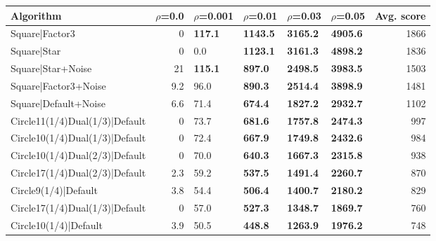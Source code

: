 \begin{tabular}{lrllllr}
\hline
 Algorithm                                                      &   $\rho$=0.0 & $\rho$=0.001   & $\rho$=0.01     & $\rho$=0.03     & $\rho$=0.05     &   Avg. score \\
\hline
 Square|Factor3                                                 &          0   & \textbf{117.1} & \textbf{1143.5} & \textbf{3165.2} & \textbf{4905.6} &         1866 \\
 Square|Star                                                    &          0   & 0.0            & \textbf{1123.1} & \textbf{3161.3} & \textbf{4898.2} &         1836 \\
 Square|Star+Noise                                              &         21   & \textbf{115.1} & \textbf{897.0}  & \textbf{2498.5} & \textbf{3983.5} &         1503 \\
 Square|Factor3+Noise                                           &          9.2 & 96.0           & \textbf{890.3}  & \textbf{2514.4} & \textbf{3898.9} &         1481 \\
 Square|Default+Noise                                           &          6.6 & 71.4           & \textbf{674.4}  & \textbf{1827.2} & \textbf{2932.7} &         1102 \\
 Circle11(1/4)Dual(1/3)|Default                                 &          0   & 73.7           & \textbf{681.6}  & \textbf{1757.8} & \textbf{2474.3} &          997 \\
 Circle10(1/4)Dual(1/3)|Default                                 &          0   & 72.4           & \textbf{667.9}  & \textbf{1749.8} & \textbf{2432.6} &          984 \\
 Circle10(1/4)Dual(2/3)|Default                                 &          0   & 70.0           & \textbf{640.3}  & \textbf{1667.3} & \textbf{2315.8} &          938 \\
 Circle17(1/4)Dual(2/3)|Default                                 &          2.3 & 59.2           & \textbf{537.5}  & \textbf{1491.4} & \textbf{2260.7} &          870 \\
 Circle9(1/4)|Default                                           &          3.8 & 54.4           & \textbf{506.4}  & \textbf{1400.7} & \textbf{2180.2} &          829 \\
 Circle17(1/4)Dual(1/3)|Default                                 &          0   & 57.0           & \textbf{527.3}  & \textbf{1348.7} & \textbf{1869.7} &          760 \\
 Circle10(1/4)|Default                                          &          3.9 & 50.5           & \textbf{448.8}  & \textbf{1263.9} & \textbf{1976.2} &          748 \\

\end{tabular}

